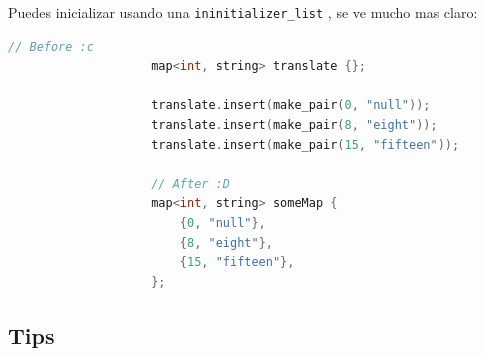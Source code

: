 \documentclass[12pt, fleqn]{report}                             %
\theoremstyle{break}                                            %
\newcommand{\textCode}[1]  { \texttt{#1} }                      %
\begin{document}
                Puedes inicializar usando una \textCode{ininitializer\_list}, se ve mucho mas claro:
                \begin{lstlisting}[language=C++, gobble=20]
                    // Before :c
                    map<int, string> translate {};

                    translate.insert(make_pair(0, "null"));
                    translate.insert(make_pair(8, "eight"));
                    translate.insert(make_pair(15, "fifteen"));
                    
                    // After :D
                    map<int, string> someMap {
                        {0, "null"},
                        {8, "eight"},
                        {15, "fifteen"},
                    };

                \end{lstlisting}

            \subsection{Tips}
\end{document}

